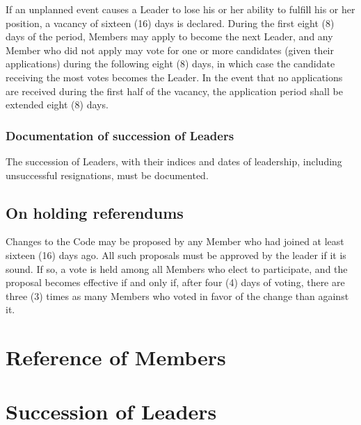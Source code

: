 \documentclass[10pt]{book}
\begin{document}
If an unplanned event causes a Leader to lose his or her ability to fulfill his or her position, a vacancy of sixteen (16) days is declared. During the first eight (8) days of the period, Members may apply to become the next Leader, and any Member who did not apply may vote for one or more candidates (given their applications) during the following eight (8) days, in which case the candidate receiving the most votes becomes the Leader. In the event that no applications are received during the first half of the vacancy, the application period shall be extended eight (8) days.

\subsection{Documentation of succession of Leaders}

The succession of Leaders, with their indices and dates of leadership, including unsuccessful resignations, must be documented.

\section{On holding referendums}

Changes to the Code may be proposed by any Member who had joined at least sixteen (16) days ago. All such proposals must be approved by the leader if it is sound. If so, a vote is held among all Members who elect to participate, and the proposal becomes effective if and only if, after four (4) days of voting, there are three (3) times as many Members who voted in favor of the change than against it.

\appendix

\chapter{Reference of Members}



\chapter{Succession of Leaders}


\end{document}
